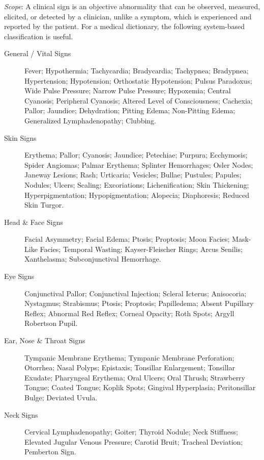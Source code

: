 \small
\noindent\textit{Scope}: A clinical sign is an objective abnormality that can be observed, measured, elicited, or detected by a clinician, unlike a symptom, which is experienced and reported by the patient. For a medical dictionary, the following system-based classification is useful.

\medskip
\begin{description}
\item[General / Vital Signs] Fever; Hypothermia; Tachycardia; Bradycardia; Tachypnea; Bradypnea; Hypertension; Hypotension; Orthostatic Hypotension; Pulsus Paradoxus; Wide Pulse Pressure; Narrow Pulse Pressure; Hypoxemia; Central Cyanosis; Peripheral Cyanosis; Altered Level of Consciousness; Cachexia; Pallor; Jaundice; Dehydration; Pitting Edema; Non-Pitting Edema; Generalized Lymphadenopathy; Clubbing.

\item[Skin Signs] Erythema; Pallor; Cyanosis; Jaundice; Petechiae; Purpura; Ecchymosis; Spider Angiomas; Palmar Erythema; Splinter Hemorrhages; Osler Nodes; Janeway Lesions; Rash; Urticaria; Vesicles; Bullae; Pustules; Papules; Nodules; Ulcers; Scaling; Excoriations; Lichenification; Skin Thickening; Hyperpigmentation; Hypopigmentation; Alopecia; Diaphoresis; Reduced Skin Turgor.

\item[Head \& Face Signs] Facial Asymmetry; Facial Edema; Ptosis; Proptosis; Moon Facies; Mask-Like Facies; Temporal Wasting; Kayser-Fleischer Rings; Arcus Senilis; Xanthelasma; Subconjunctival Hemorrhage.

\item[Eye Signs] Conjunctival Pallor; Conjunctival Injection; Scleral Icterus; Anisocoria; Nystagmus; Strabismus; Ptosis; Proptosis; Papilledema; Absent Pupillary Reflex; Abnormal Red Reflex; Corneal Opacity; Roth Spots; Argyll Robertson Pupil.

\item[Ear, Nose \& Throat Signs] Tympanic Membrane Erythema; Tympanic Membrane Perforation; Otorrhea; Nasal Polyps; Epistaxis; Tonsillar Enlargement; Tonsillar Exudate; Pharyngeal Erythema; Oral Ulcers; Oral Thrush; Strawberry Tongue; Coated Tongue; Koplik Spots; Gingival Hyperplasia; Peritonsillar Bulge; Deviated Uvula.

\item[Neck Signs] Cervical Lymphadenopathy; Goiter; Thyroid Nodule; Neck Stiffness; Elevated Jugular Venous Pressure; Carotid Bruit; Tracheal Deviation; Pemberton Sign.


\end{description}

